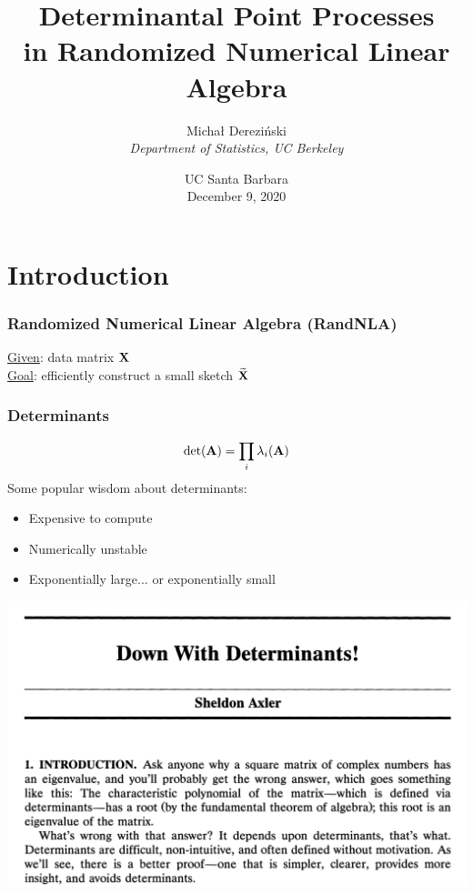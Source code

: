\documentclass{beamer}
\title[]{Determinantal Point Processes\\
  in Randomized Numerical Linear Algebra}
\author[]{Micha{\l} Derezi\'{n}ski\\
\textit{Department of Statistics, UC Berkeley}}
\date{UC Santa Barbara\\
December 9, 2020}
\begin{document}
\begin{frame}
  \titlepage
\end{frame}

\linespread{1.3}

\section{Introduction}

\begin{frame}
  \frametitle{Randomized Numerical Linear Algebra (RandNLA)}
\underline{Given}: data matrix $\mathbf X$ \\[2mm]
\underline{Goal}: efficiently construct a small sketch $\widetilde{\mathbf{X}}$ \pause\vspace{1cm}
  \begin{center}
  \hspace{5mm}
\end{center}
\end{frame}

\begin{frame}
  \frametitle{Determinants}
  \[\det(\mathbf A) = \prod_i \lambda_i(\mathbf A)\]\pause
  Some popular wisdom about determinants: \pause
  \vspace{3mm}
  \begin{itemize}
  \item Expensive to compute\pause
    \vspace{3mm}
  \item Numerically unstable\pause
    \vspace{3mm}
    \item Exponentially large... \pause or exponentially small
    \end{itemize}
    \vspace{3mm}
    \pause
\centering    \includegraphics[width=.72\textwidth]{figs/down-with-determinants.png}
  \end{frame}
\end{document}

